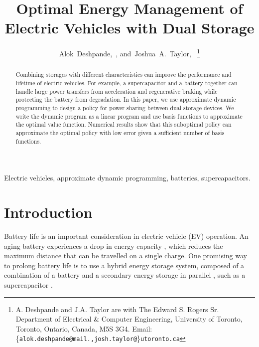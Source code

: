 \documentclass[conference]{IEEEtran}
\begin{document}
\title{Optimal Energy Management of Electric Vehicles with Dual Storage}

\author{Alok~Deshpande,~, and~Joshua~A.~Taylor,~%
\thanks{A. Deshpande and J.A. Taylor are with The Edward S. Rogers Sr. Department of Electrical \& Computer Engineering, University of Toronto, Toronto, Ontario, Canada, M5S 3G4. Email: \{\texttt{alok.deshpande@mail.,josh.taylor@}\}\texttt{utoronto.ca}}%
}

\maketitle

\begin{abstract}
Combining storages with different characteristics can improve the performance and lifetime of electric vehicles. For example, a supercapacitor and a battery together can handle large power transfers from acceleration and regenerative braking while protecting the battery from degradation. In this paper, we use approximate dynamic programming to design a policy for power sharing between dual storage devices. We write the dynamic program as a linear program and use basis functions to approximate the optimal value function. Numerical results show that this suboptimal policy can approximate the optimal policy with low error given a sufficient number of basis functions.
\end{abstract}
\begin{IEEEkeywords}
Electric vehicles, approximate dynamic programming, batteries, supercapacitors.\end{IEEEkeywords}

\section{Introduction}
Battery life is an important consideration in electric vehicle (EV) operation. An aging battery experiences a drop in energy capacity \cite{8449100}, which reduces the maximum distance that can be travelled on a single charge. One promising way to prolong battery life is to use a hybrid energy storage system, composed of a combination of a battery and a secondary energy storage in parallel \cite{thounthong2009energy}, such as a supercapacitor \cite{thounthong2009energy,bambang2014energy,7939849}. 
\end{document}
